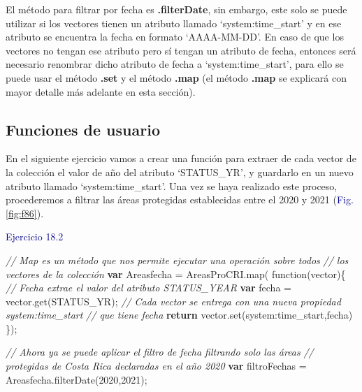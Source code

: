 \documentclass[
  12pt,
  letterpaper,
  twoside]{book}
\newenvironment{Shaded}{\begin{snugshade}}{\end{snugshade}}
\newcommand{\CommentTok}[1]{\textcolor[rgb]{0.24,0.58,0.00}{\textit{#1}}}
\newcommand{\ControlFlowTok}[1]{\textcolor[rgb]{0.00,0.00,0.00}{\textbf{#1}}}
\newcommand{\DecValTok}[1]{\textcolor[rgb]{0.28,0.53,0.93}{#1}}
\newcommand{\FunctionTok}[1]{\textcolor[rgb]{0.48,0.12,0.64}{#1}}
\newcommand{\KeywordTok}[1]{\textcolor[rgb]{0.48,0.12,0.64}{#1}}
\newcommand{\NormalTok}[1]{#1}
\newcommand{\OperatorTok}[1]{\textcolor[rgb]{0.00,0.00,0.00}{#1}}
\newcommand{\StringTok}[1]{\textcolor[rgb]{0.87,0.29,0.22}{#1}}
\newcommand\boldpurple[1]{\textcolor{darkpurple}{\textbf{#1}}}
\begin{document}
El método para filtrar por fecha es \boldpurple{.filterDate}, sin embargo, este solo se puede utilizar si los vectores tienen un atributo llamado `system:time\_start' y en ese atributo se encuentra la fecha en formato `AAAA-MM-DD'. En caso de que los vectores no tengan ese atributo pero sí tengan un atributo de fecha, entonces será necesario renombrar dicho atributo de fecha a `system:time\_start', para ello se puede usar el método \boldpurple{.set} y el método \boldpurple{.map} (el método \boldpurple{.map} se explicará con mayor detalle más adelante en esta sección).

\hypertarget{funciones-de-usuario}{%
\subsection*{Funciones de usuario}\label{funciones-de-usuario}}

En el siguiente ejercicio vamos a crear una función para extraer de cada vector de la colección el valor de año del atributo `STATUS\_YR', y guardarlo en un nuevo atributo llamado `system:time\_start'. Una vez se haya realizado este proceso, procederemos a filtrar las áreas protegidas establecidas entre el 2020 y 2021 (\textcolor{darkblue}{Fig.} \ref{fig:f86}).

\textcolor{darkblue}{Ejercicio 18.2}

\begin{Shaded}
\begin{Highlighting}[]
\CommentTok{// Map es un método que nos permite ejecutar una operación sobre todos }
\CommentTok{// los vectores de la colección}
\ControlFlowTok{var}\NormalTok{ Areasfecha }\OperatorTok{=}\NormalTok{ AreasProCRI}\OperatorTok{.}\FunctionTok{map}\NormalTok{( }\KeywordTok{function}\NormalTok{(vector)\{ }
  \CommentTok{// Fecha extrae el valor del atributo \textquotesingle{}STATUS\_YEAR\textquotesingle{}}
  \ControlFlowTok{var}\NormalTok{ fecha }\OperatorTok{=}\NormalTok{ vector}\OperatorTok{.}\FunctionTok{get}\NormalTok{(}\StringTok{\textquotesingle{}STATUS\_YR\textquotesingle{}}\NormalTok{)}\OperatorTok{;}   
  \CommentTok{// Cada vector se entrega con una nueva propiedad \textquotesingle{}system:time\_start\textquotesingle{} }
  \CommentTok{// que tiene fecha}
  \ControlFlowTok{return}\NormalTok{ vector}\OperatorTok{.}\FunctionTok{set}\NormalTok{(}\StringTok{\textquotesingle{}system:time\_start\textquotesingle{}}\OperatorTok{,}\NormalTok{fecha)}
\NormalTok{\})}\OperatorTok{;} 

\CommentTok{// Ahora ya se puede aplicar el filtro de fecha filtrando solo las áreas }
\CommentTok{// protegidas de Costa Rica declaradas en el año 2020}
\ControlFlowTok{var}\NormalTok{ filtroFechas }\OperatorTok{=}\NormalTok{ Areasfecha}\OperatorTok{.}\FunctionTok{filterDate}\NormalTok{(}\DecValTok{2020}\OperatorTok{,}\DecValTok{2021}\NormalTok{)}\OperatorTok{;} 
\end{Highlighting}
\end{Shaded}
\end{document}
